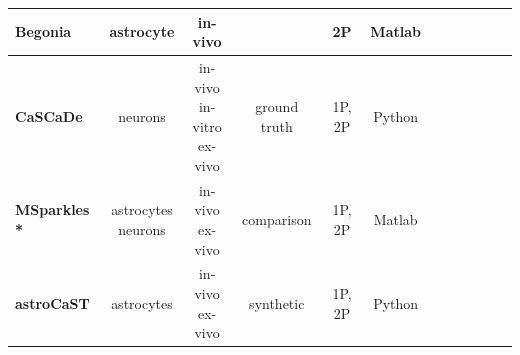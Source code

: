 \documentclass[utf8]{FrontiersinHarvard}
\newcommand{\cmark}{\ding{51}} %
\newcommand{\xmark}{\textemdash} %
\begin{document}
\begin{table}[htb]
\begin{tabular}{|l|c|c|c|c|c|c|c|c|c|c|c|}
            \hline \textbf{Begonia\citep{bjornstad_begoniatwo-photon_2021}} & astrocyte & in-vivo & \xmark & 2P & Matlab & \cmark & \cmark \\
            \hline \textbf{CaSCaDe\citep{rupprecht_database_2021}} & neurons & \makecell{in-vivo \\in-vitro \\ex-vivo} & ground truth & 1P, 2P & Python & \cmark & \xmark \\
            \hline \textbf{MSparkles\citep{stopper_novel_2022} *} & \makecell{astrocytes \\neurons} & \makecell{in-vivo \\ex-vivo} & comparison & 1P, 2P & Matlab & \xmark & \cmark \\
            \hline \textbf{astroCaST} & astrocytes & \makecell{in-vivo \\ex-vivo} & synthetic & 1P, 2P & Python & \cmark & \cmark \\
            \hline
        \end{tabular}
    \end{table}
    \egroup

\end{document}
